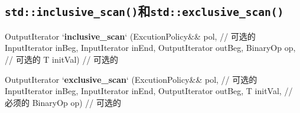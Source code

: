 \subsection{\texttt{std::inclusive\_scan()}和\texttt{std::exclusive\_scan()}}\label{ch23.2.3}
\begin{blacklisting}
OutputIterator
`\textbf{inclusive\_scan}` (ExcutionPolicy&& pol,   // 可选的
                InputIterator inBeg, InputIterator inEnd,
                OutputIterator outBeg,
                BinaryOp op,            // 可选的
                T initVal)              // 可选的

OutputIterator
`\textbf{exclusive\_scan}` (ExcutionPolicy&& pol,   // 可选的
                InputIterator inBeg, InputIterator inEnd,
                OutputIterator outBeg,
                T initVal,              // 必须的
                BinaryOp op)            // 可选的
\end{blacklisting}
